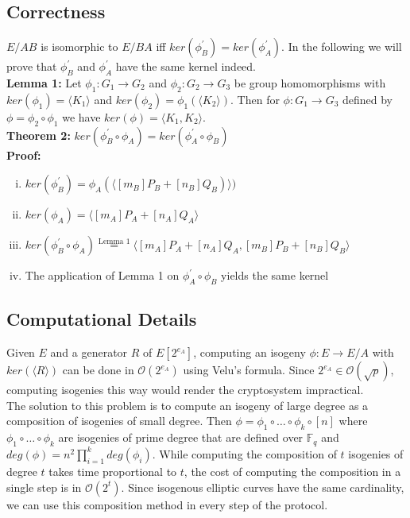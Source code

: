 \subsection{Correctness}
\label{ch:correctness}

$E/AB$ is isomorphic to $E/BA$ iff $ker(\phi_B^{\prime})=ker(\phi_A^{\prime})$. %
In the following we will prove that $\phi_B^{\prime}$ and $\phi_A^{\prime}$ have the same kernel indeed.\\

\textbf{Lemma 1:} Let $\phi_1: G_1 \to G_2$ and $\phi_2: G_2 \to G_3$ be group homomorphisms with $ker(\phi_1) = \langle K_1 \rangle$ and $ker(\phi_2) = \phi_1(\langle K_2 \rangle)$. Then for $\phi:G_1 \to G_3$ defined by $\phi=\phi_2 \circ \phi_1$ we have $ker(\phi) =\langle K_1,K_2\rangle$.\\%

\textbf{Theorem 2:} $ker(\phi_B^{\prime} \circ \phi_A) = ker(\phi_A^{\prime} \circ \phi_B)$\\
\textbf{Proof:}
\begin{enumerate}[(i)]
	\item $ker(\phi_B^{\prime})=\phi_A(\langle [m_B]P_B + [n_B]Q_B)\rangle)$
	\item $ker(\phi_A)=\langle [m_A]P_A + [n_A]Q_A\rangle$
	\item $ker(\phi_B^{\prime} \circ \phi_A) \stackrel{\text{Lemma 1}}{=} \langle [m_A]P_A + [n_A]Q_A, [m_B]P_B + [n_B]Q_B \rangle$
	\item The application of Lemma 1 on $\phi_A^{\prime} \circ \phi_B$ yields the same kernel
\end{enumerate}



\subsection{Computational Details}


Given $E$ and a generator $R$ of $E[2^{e_A}]$, computing an isogeny $\phi:E \to E/A$ with $ker(\langle R \rangle)$  can be done in $\mathcal{O}(2^{e_A})$ using Velu's formula. %
Since $2^{e_A} \in \mathcal{O}(\sqrt{p})$, computing isogenies this way would render the cryptosystem impractical.\\
	
The solution to this problem is to compute an isogeny of large degree as a composition of isogenies of small degree. Then $\phi = \phi_1 \circ \dots \circ \phi_k \circ [n]$ where $\phi_1 \circ \dots \circ \phi_k$ are isogenies of prime degree that are defined over $\mathbb{F}_q$ and $deg(\phi) = n^2 \prod^k_{i=1} deg(\phi_i)$. While computing the composition of $t$ isogenies of degree $t$ takes time proportional to $t$, the cost of computing the composition in a single step is in $\mathcal{O}(2^t)$. Since isogenous elliptic curves have the same cardinality, we can use this composition method in every step of the protocol.